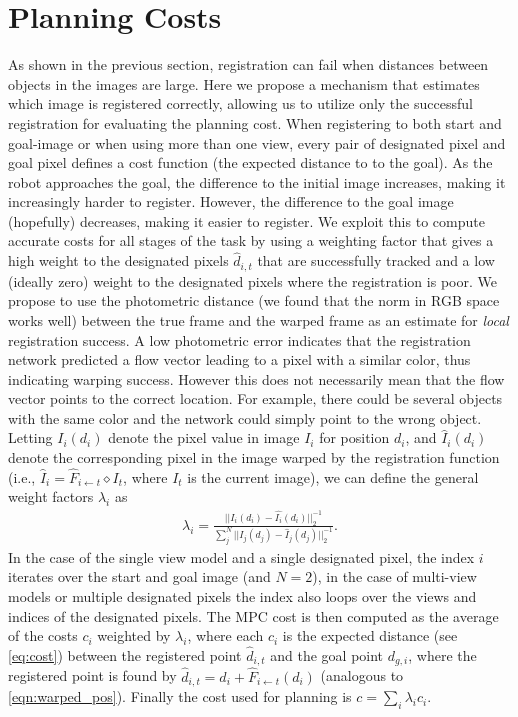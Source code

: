\vspace{-0.1cm}
\section{Planning Costs}
\vspace{-0.2cm}
As shown in the previous section, registration can fail when distances between objects in the images are large. Here we propose a mechanism that estimates which image is registered correctly, allowing us to utilize only the successful registration for evaluating the planning cost.
When registering to both start and goal-image or when using more than one view, every pair of designated pixel and goal pixel defines a cost function (the expected distance to to the goal). As the robot approaches the goal, the difference to the initial image increases, making it increasingly harder to register. However, the difference to the goal image (hopefully) decreases, making it easier to register.
We exploit this to compute accurate costs for all stages of the task by using a weighting factor that gives a high weight to the designated pixels $\hat{d}_{i,t}$ that are successfully tracked and a low (ideally zero) weight to the designated pixels where the registration is poor. We propose to use the photometric distance (we found that the norm in RGB space works well) between the true frame and the warped frame as an estimate for \emph{local} registration success. A low photometric error indicates that the registration network predicted a flow vector leading to a pixel with a similar color, thus indicating warping success. However this does not necessarily mean that the flow vector points to the correct location. For example, there could be several objects with the same color and the network could simply point to the wrong object. Letting $I_i(d_i)$ denote the pixel value in image $I_i$ for position $d_i$, and $\hat{I}_i(d_i)$ denote the corresponding pixel in the image warped by the registration function (i.e., $\hat{I}_i = \hat{F}_{i \leftarrow t} \diamond I_t$, where $I_t$ is the current image), we can define the general weight factors $\lambda_i$ as
\begin{align}
\lambda_i =  \frac{||I_i(d_i) - \hat{I_i}(d_i)||_2^{-1}}{\sum^N_j ||I_j(d_j) - \hat{I}_j(d_j)||^{-1}_2}.
\label{eqn:cost_avg}
\end{align}
In the case of the single view model and a single designated pixel, the index $i$ iterates over the start and goal image (and $N=2$), in the case of multi-view models or multiple designated pixels the index also loops over the views and indices of the designated pixels. 
The MPC cost is then computed as the average of the costs $c_i$ weighted by $\lambda_i$, where each $c_i$ is the expected distance (see \autoref{eq:cost}) between the registered point $\hat{d}_{i,t}$ and the goal point $d_{g,i}$, where the registered point is found by $\hat{d}_{i,t} = d_i + \hat{F}_{i \leftarrow t}(d_i)$ (analogous to \autoref{eqn:warped_pos}). Finally the cost used for planning is $c = \sum_i \lambda_i c_i$.
